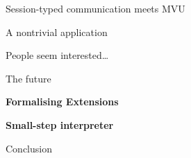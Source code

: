 \documentclass[11.5pt, aspectratio=169]{beamer}
\begin{document}
\begin{frame}{Session-typed communication meets MVU}
\end{frame}

\begin{frame}{A nontrivial application}
\end{frame}

\begin{frame}{People seem interested\ldots}
\end{frame}


\begin{frame}{The future}
  \begin{fullpageitemize}
    \item {\large \textbf{Formalising Extensions}}
    \item {\large \textbf{Small-step interpreter}}
  \end{fullpageitemize}
\end{frame}

\begin{frame}{Conclusion}
\end{frame}
\end{document}
